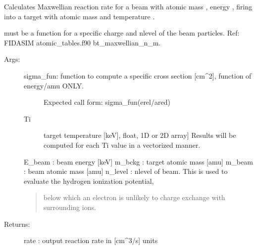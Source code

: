 \documentclass[letterpaper,10pt,english]{sphinxmanual}
\begin{document}
\begin{fulllineitems}
\label{\detokenize{aurora:aurora.nbi_neutrals.bt_rate_maxwell_average}}
Calculates Maxwellian reaction rate for a beam with atomic mass , 
energy , firing into a target with atomic mass  and temperature .

 must be a function for a specific charge and n\sphinxhyphen{}level of the beam particles.
Ref: FIDASIM atomic\_tables.f90 bt\_maxwellian\_n\_m.
\begin{description}
\item[{Args:}] \leavevmode\begin{description}
\item[{sigma\_fun: function to compute a specific cross section {[}cm\textasciicircum{}2{]}, function of energy/amu ONLY.}] \leavevmode
Expected call form: sigma\_fun(erel/ared)

\item[{Ti}] \leavevmode{[}target temperature {[}keV{]}, float, 1D or 2D array{]}
Results will be computed for each Ti value in a vectorized manner.

\end{description}

E\_beam : beam energy {[}keV{]}
m\_bckg : target atomic mass {[}amu{]}
m\_beam : beam atomic mass {[}amu{]}
n\_level : n\sphinxhyphen{}level of beam. This is used to evaluate the hydrogen ionization potential,
\begin{quote}

below which an electron is unlikely to charge exchange with surrounding ions.
\end{quote}

\item[{Returns:}] \leavevmode
rate : output reaction rate in {[}cm\textasciicircum{}3/s{]} units

\end{description}

\end{fulllineitems}

\end{document}
